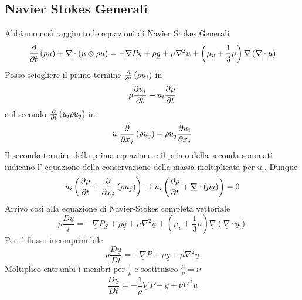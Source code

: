 \subsection{Navier Stokes Generali}
Abbiamo così raggiunto le equazioni di Navier Stokes Generali
\begin{equation}
  \label{eq:navi_stok_gen}
  \frac{\partial}{\partial t}\left( \rho \underline{u}\right)  + \underline{\nabla}\cdot \left( \underline{u} \otimes \rho \underline{u}\right)  = -\underline{\nabla}P_S +\rho \underline{g}+\mu \nabla^2 \underline{u}+ \left( \mu _v+\frac{1}{3}\mu \right) \underline{\nabla}\left( \underline{\nabla}\cdot \underline{u}\right) 
\end{equation}
Posso sciogliere il primo termine $ \frac{\partial}{\partial t}\left( \rho u_i\right)  $ in
\[
  \rho \frac{\partial u_i}{\partial t}+ u_i \frac{\partial\rho }{\partial t}  
\]
e il secondo $ \frac{\partial}{\partial t}\left( u_i\rho u_j \right) $ in
\[
u_i\frac{\partial}{\partial x_j}\left( \rho u_j\right) +\rho u_j\frac{\partial u_i}{\partial x_j}
\]
Il secondo termine della prima equazione e il primo della seconda sommati indicano l' equazione della conservazione della massa moltiplicata per $ u_i $.
Dunque
\[
  u_i \left( \frac{\partial\rho }{\partial t}+\frac{\partial}{\partial x_j}\left( \rho u_j\right) \right) \rightarrow u_i\left( \frac{\partial\rho }{\partial t}+\underline{\nabla}\cdot \left( \rho \underline{u}\right) \right) =0
\]
Arrivo così alla equazione di Navier-Stokes completa vettoriale
\begin{equation}
  \label{eq:NV_comp_vett}
  \rho \frac{ D \underline{u}}{t} = - \underline{\nabla}P_S +\rho \underline{g}+\mu \nabla ^2 \underline{u} + \left( \mu _v +\frac{1}{3} \mu \right) \underline{\nabla}\left( \underline{\nabla}\cdot \underline{u}\right) 
\end{equation}
Per il flusso incomprimibile
\[
\rho \frac{D \underline{u}}{Dt} = - \underline{\nabla} P + \rho \underline{g}+\mu \nabla^2 \underline{u}
\]
Moltiplico entrambi i membri per $ \frac{1}{\rho } $ e sostituisco $ \frac{\mu}{\rho } = \nu  $
\begin{equation}
  \label{eq:NV_flux_incompr}
  \frac{D\underline{u}}{Dt} = -\frac{1}{\rho }\underline{\nabla} P + \underline{g} + \nu  \nabla ^2 \underline{u}
\end{equation}


